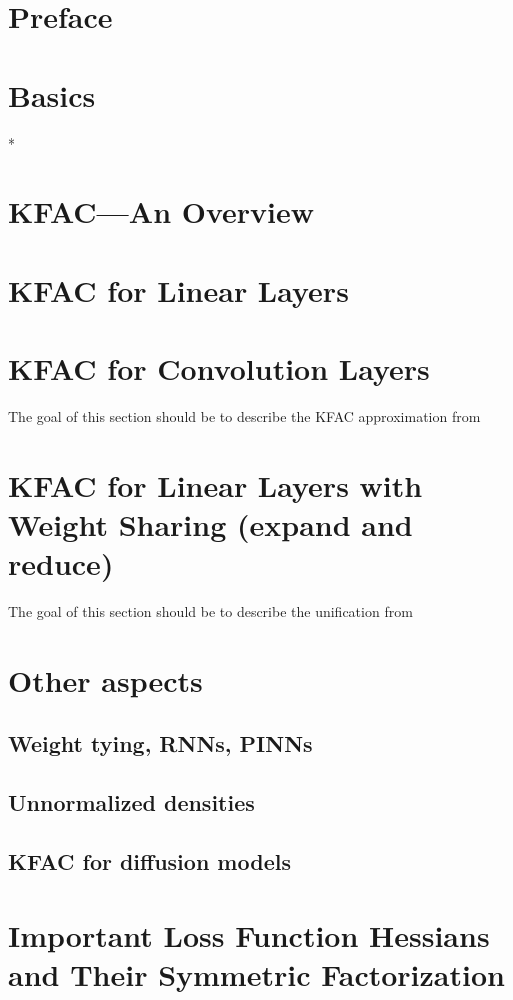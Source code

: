 \documentclass{article}
\begin{document}
\onecolumn


\clearpage

\tableofcontents
\clearpage

\section{Preface}

\clearpage

\begin{paracol}{2}
  \section{Basics}
  

  \switchcolumn[0]*
  \section{KFAC---An Overview}
  

  \section{KFAC for Linear Layers}
  

  \section{KFAC for Convolution Layers}
  The goal of this section should be to describe the KFAC approximation from~\cite{grosse2016kroneckerfactored}

  \section{KFAC for Linear Layers with Weight Sharing (expand and reduce)}
  The goal of this section should be to describe the unification from~\cite{eschenhagen2023kroneckerfactored}

  \section{Other aspects}
  \subsection{Weight tying, RNNs, PINNs}
  \subsection{Unnormalized densities}
  \subsection{KFAC for diffusion models}

\end{paracol}

\clearpage


\appendix

\section{Important Loss Function Hessians and Their Symmetric Factorization}\label{app:loss_function_hessians}

\end{document}
